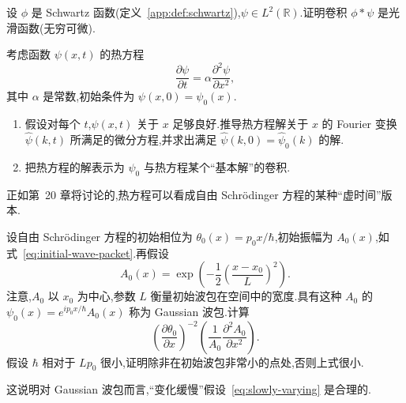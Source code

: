 \begin{exercise}\label{ex:convolution-smooth}
设 \(\phi\) 是 Schwartz 函数(定义~\ref{app:def:schwartz}),\(\psi\in L^{2}(\mathbb{R})\).证明卷积 \(\phi*\psi\) 是光滑函数(无穷可微).
\end{exercise}

\begin{exercise}\label{ex:heat-equation}
考虑函数 \(\psi(x,t)\) 的热方程
\[
\frac{\partial\psi}{\partial t}
=\alpha\frac{\partial^{2}\psi}{\partial x^{2}},
\]
其中 \(\alpha\) 是常数,初始条件为 \(\psi(x,0)=\psi_{0}(x)\).
\begin{enumerate}
\item 假设对每个 \(t\),\(\psi(x,t)\) 关于 \(x\) 足够良好.推导热方程解关于 \(x\) 的 Fourier 变换 \(\widehat{\psi}(k,t)\) 所满足的微分方程,并求出满足 \(\widehat{\psi}(k,0)=\widehat{\psi}_{0}(k)\) 的解.
\item 把热方程的解表示为 \(\psi_{0}\) 与热方程某个“基本解”的卷积.
\end{enumerate}
\begin{note}
正如第~20 章将讨论的,热方程可以看成自由 Schrödinger 方程的某种“虚时间”版本.
\end{note}
\end{exercise}

\begin{exercise}\label{ex:gaussian-wave-packet}
设自由 Schrödinger 方程的初始相位为 \(\theta_{0}(x)=p_{0}x/\hbar\),初始振幅为 \(A_{0}(x)\),如式~\eqref{eq:initial-wave-packet}.再假设
\[
A_{0}(x)=\exp\left(-\frac{1}{2}\left(\frac{x-x_{0}}{L}\right)^{2}\right).
\]
注意,\(A_{0}\) 以 \(x_{0}\) 为中心,参数 \(L\) 衡量初始波包在空间中的宽度.具有这种 \(A_{0}\) 的 \(\psi_{0}(x)=e^{ip_{0}x/\hbar}A_{0}(x)\) 称为 Gaussian 波包.计算
\[
\left(\frac{\partial\theta_{0}}{\partial x}\right)^{-2}
\left(\frac{1}{A_{0}}\frac{\partial^{2}A_{0}}{\partial x^{2}}\right).
\]
假设 \(\hbar\) 相对于 \(Lp_{0}\) 很小,证明除非在初始波包非常小的点处,否则上式很小.
\begin{note}
这说明对 Gaussian 波包而言,“变化缓慢”假设~\eqref{eq:slowly-varying} 是合理的.
\end{note}
\end{exercise}

